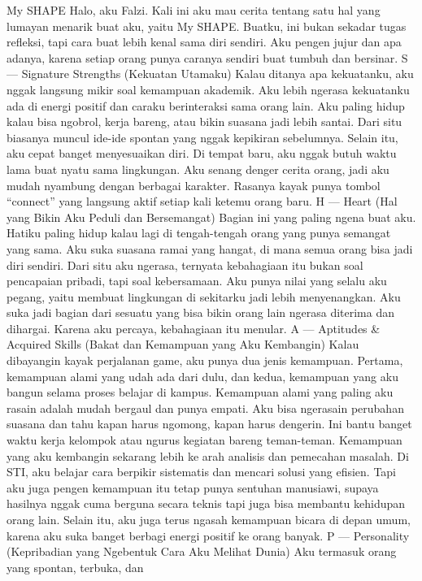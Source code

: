 \documentclass[
  letterpaper,
  DIV=11,
  numbers=noendperiod]{scrreprt}
\begin{document}
My SHAPE Halo, aku Falzi. Kali ini aku mau cerita tentang satu hal yang
lumayan menarik buat aku, yaitu My SHAPE. Buatku, ini bukan sekadar
tugas refleksi, tapi cara buat lebih kenal sama diri sendiri. Aku pengen
jujur dan apa adanya, karena setiap orang punya caranya sendiri buat
tumbuh dan bersinar. S --- Signature Strengths (Kekuatan Utamaku) Kalau
ditanya apa kekuatanku, aku nggak langsung mikir soal kemampuan
akademik. Aku lebih ngerasa kekuatanku ada di energi positif dan caraku
berinteraksi sama orang lain. Aku paling hidup kalau bisa ngobrol, kerja
bareng, atau bikin suasana jadi lebih santai. Dari situ biasanya muncul
ide-ide spontan yang nggak kepikiran sebelumnya. Selain itu, aku cepat
banget menyesuaikan diri. Di tempat baru, aku nggak butuh waktu lama
buat nyatu sama lingkungan. Aku senang denger cerita orang, jadi aku
mudah nyambung dengan berbagai karakter. Rasanya kayak punya tombol
``connect'' yang langsung aktif setiap kali ketemu orang baru. H ---
Heart (Hal yang Bikin Aku Peduli dan Bersemangat) Bagian ini yang paling
ngena buat aku. Hatiku paling hidup kalau lagi di tengah-tengah orang
yang punya semangat yang sama. Aku suka suasana ramai yang hangat, di
mana semua orang bisa jadi diri sendiri. Dari situ aku ngerasa, ternyata
kebahagiaan itu bukan soal pencapaian pribadi, tapi soal kebersamaan.
Aku punya nilai yang selalu aku pegang, yaitu membuat lingkungan di
sekitarku jadi lebih menyenangkan. Aku suka jadi bagian dari sesuatu
yang bisa bikin orang lain ngerasa diterima dan dihargai. Karena aku
percaya, kebahagiaan itu menular. A --- Aptitudes \& Acquired Skills
(Bakat dan Kemampuan yang Aku Kembangin) Kalau dibayangin kayak
perjalanan game, aku punya dua jenis kemampuan. Pertama, kemampuan alami
yang udah ada dari dulu, dan kedua, kemampuan yang aku bangun selama
proses belajar di kampus. Kemampuan alami yang paling aku rasain adalah
mudah bergaul dan punya empati. Aku bisa ngerasain perubahan suasana dan
tahu kapan harus ngomong, kapan harus dengerin. Ini bantu banget waktu
kerja kelompok atau ngurus kegiatan bareng teman-teman. Kemampuan yang
aku kembangin sekarang lebih ke arah analisis dan pemecahan masalah. Di
STI, aku belajar cara berpikir sistematis dan mencari solusi yang
efisien. Tapi aku juga pengen kemampuan itu tetap punya sentuhan
manusiawi, supaya hasilnya nggak cuma berguna secara teknis tapi juga
bisa membantu kehidupan orang lain. Selain itu, aku juga terus ngasah
kemampuan bicara di depan umum, karena aku suka banget berbagi energi
positif ke orang banyak. P --- Personality (Kepribadian yang Ngebentuk
Cara Aku Melihat Dunia) Aku termasuk orang yang spontan, terbuka, dan
\end{document}

